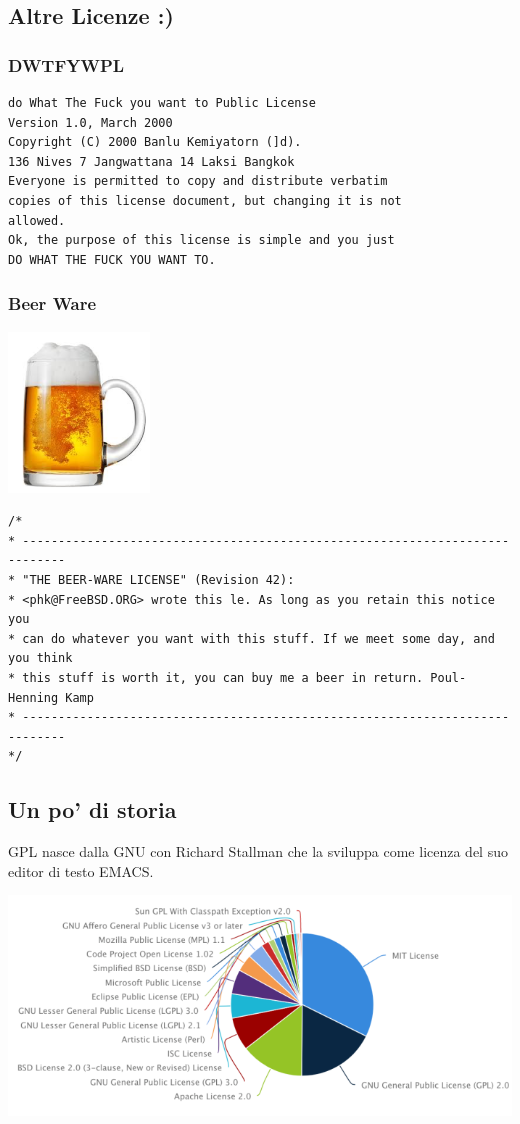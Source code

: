 \documentclass[10pt,a4paper]{book}
\begin{document}
\subsection{Altre Licenze :)}
\subsubsection{DWTFYWPL}
\begin{verbatim}
do What The Fuck you want to Public License
Version 1.0, March 2000
Copyright (C) 2000 Banlu Kemiyatorn (]d).
136 Nives 7 Jangwattana 14 Laksi Bangkok
Everyone is permitted to copy and distribute verbatim
copies of this license document, but changing it is not
allowed.
Ok, the purpose of this license is simple and you just
DO WHAT THE FUCK YOU WANT TO.
\end{verbatim}

\subsubsection{Beer Ware}
\includegraphics[scale=0.31]{beer.png} \\
\begin{verbatim}
/*
* ----------------------------------------------------------------------------
* "THE BEER-WARE LICENSE" (Revision 42):
* <phk@FreeBSD.ORG> wrote this le. As long as you retain this notice you
* can do whatever you want with this stuff. If we meet some day, and you think
* this stuff is worth it, you can buy me a beer in return. Poul-Henning Kamp
* ----------------------------------------------------------------------------
*/
\end{verbatim}

\subsection{Un po' di storia}
GPL nasce dalla GNU con Richard Stallman che la sviluppa come licenza del suo editor di testo EMACS.


\includegraphics[scale=0.31]{lic.png} \\
\end{document}
